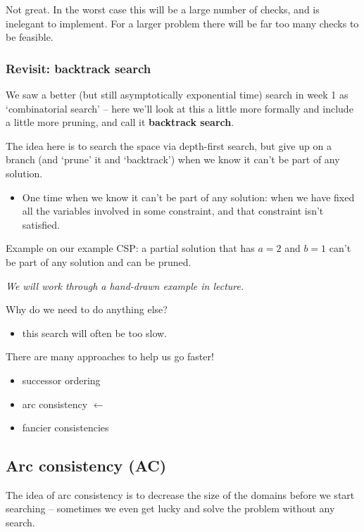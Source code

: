 \documentclass[11pt]{article}
\begin{document}
Not great. In the worst case this will be a large number of checks, and is inelegant to implement. For a larger problem there will be far too many checks to be feasible.

\subsubsection{Revisit: backtrack search}

We saw a better (but still asymptotically exponential time) search in week 1 as `combinatorial search' -- here we'll look at this a little more formally and include a little more pruning, and call it \textbf{backtrack search}.

The idea here is to search the space via depth-first search, but give up on a branch (and `prune' it and `backtrack') when we know it can't be part of any solution.
\begin{itemize}
    \item One time when we know it can't be part of any solution: when we have fixed all the variables involved in some constraint, and that constraint isn't satisfied.
\end{itemize}

Example on our example CSP: a partial solution that has $a = 2$ and $b = 1$ can't be part of any solution and can be pruned.

\emph{We will work through a hand-drawn example in lecture.}

Why do we need to do anything else?
\begin{itemize}
    \item this search will often be too slow.
\end{itemize}

There are many approaches to help us go faster!
\begin{itemize}
    \item successor ordering
    \item arc consistency $\leftarrow$
    \item fancier consistencies
\end{itemize}

\subsection{Arc consistency (AC)}

The idea of arc consistency is to decrease the size of the domains before we start searching -- sometimes we even get lucky and solve the problem without any search.
\end{document}
